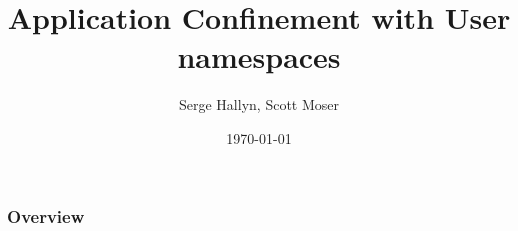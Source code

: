 \documentclass{beamer}
\title[User Namespaces]{Application Confinement with User namespaces} %
\author{Serge Hallyn, Scott Moser} %
\institute[Canonical] %
{
Canonical, Inc \\ %
\medskip
\textit{serge.hallyn@ubuntu.com, scott.moser@canonical.com} %
}
\date{\today} %
\begin{document}
\begin{frame}
\titlepage %
\end{frame}

\begin{frame}
\frametitle{Overview} %
\tableofcontents %
\end{frame}


\end{document}
